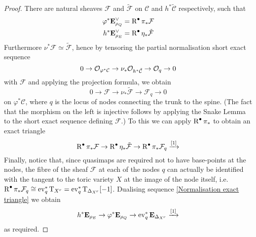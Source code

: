 \begin{proof}
There are natural sheaves $\mathcal{F}$ and $\tilde{\mathcal{F}}$ on $\mathcal{C}$ and $h^* \tilde{\mathcal{C}}$ respectively, such that
\begin{align*} \varphi^*\mathbf{E}_{\rho_Q}^\vee & = \operatorname{R}^{\bullet} \pi_* \mathcal{F} \\
h^* \mathbf{E}_{\rho_E}^\vee & = \operatorname{R}^{\bullet} \eta_* \tilde{\mathcal{F}} \end{align*}
Furthermore $\nu^*\mathcal{F}\simeq\tilde{\mathcal{F}}$, hence by tensoring the partial normalisation short exact sequence
\begin{equation*} 0 \rightarrow \mathcal{O}_{\varphi^*{\mathcal{C}}} \rightarrow \nu_* \mathcal{O}_{h^* \tilde{\mathcal{C}}} \rightarrow \mathcal{O}_q \rightarrow 0 \end{equation*}
with $\mathcal{F}$ and applying the projection formula, we obtain
\begin{equation*} 0 \to \mathcal{F} \to \nu_* \tilde{\mathcal{F}} \to \mathcal{F}_q \to 0 \end{equation*}
on $\varphi^*\mathcal{C}$, where $q$ is the locus of nodes connecting the trunk to the spine. (The fact that the morphism on the left is injective follows by applying the Snake Lemma to the short exact sequence defining $\mathcal{F}$.) To this we can apply $\operatorname{R}^{\bullet} \pi_*$ to obtain an exact triangle
\begin{equation} \label{Normalisation exact triangle} \operatorname{R}^{\bullet} \pi_* \mathcal{F} \rightarrow \operatorname{R}^{\bullet} \eta_* \tilde{\mathcal{F}} \rightarrow \operatorname{R}^{\bullet} \pi_* \mathcal{F}_q \xrightarrow{[1]} \end{equation}
Finally, notice that, since quasimaps are required not to have base-points at the nodes, the fibre of the sheaf $\mathcal F$ at each of the nodes $q$ can actually be identified with the tangent to the toric variety $X$ at the image of the node itself, i.e. $\operatorname{R}^{\bullet} \pi_* \mathcal{F}_q \cong \operatorname{ev}_q^* \operatorname{T}_{X^r}= \operatorname{ev}_q^* \mathbf{\operatorname{T}}_{\Delta_{X^r}}[-1]$. Dualising sequence \eqref{Normalisation exact triangle} we obtain
\begin{equation*} h^* \mathbf{E}_{\rho_E} \rightarrow \varphi^* \mathbf{E}_{\rho_Q} \rightarrow \operatorname{ev}_q^* \mathbf{E}_{\Delta_{X^r}} \xrightarrow{[1]} \end{equation*}
as required. \end{proof}